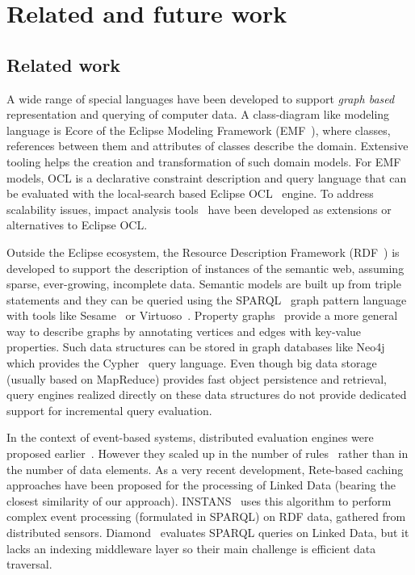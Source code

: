 \chapter{Related and future work}
\label{chap:related-work}

\section{Related work}
\label{sec:relwork}

A wide range of special languages have been developed to support \emph{graph based} representation and querying of computer data. A class-diagram like modeling language is Ecore of the Eclipse Modeling Framework (EMF~\cite{EMF}), where classes, references between them and attributes of classes describe the domain. Extensive tooling helps the creation and transformation of such domain models. For EMF models, OCL is a declarative constraint description and query language that can be evaluated with the local-search based Eclipse OCL~\cite{EclipseOCL} engine. To address scalability issues, impact analysis tools~\cite{OCLIA} have been developed as extensions or alternatives to Eclipse OCL.

Outside the Eclipse ecosystem, the Resource Description Framework (RDF~\cite{website:rdf_standard}) is developed to support the description of instances of the semantic web, assuming sparse, ever-growing, incomplete data. Semantic models are built up from triple statements and they can be queried using the SPARQL~\cite{SPARQL} graph pattern language with tools like Sesame~\cite{sesame} or Virtuoso~\cite{openvirtuoso}. Property graphs~\cite{DBLP:journals/corr/abs-1006-2361} provide a more general way to describe graphs by annotating vertices and edges with key-value properties. Such data structures can be stored in graph databases like Neo4j~\cite{neo4j} which provides the Cypher~\cite{cypher} query language. Even though big data storage (usually based on MapReduce) provides fast object persistence and retrieval, query engines realized directly on these data structures do not provide dedicated support for incremental query evaluation. 

In the context of event-based systems, distributed evaluation engines were proposed earlier~\cite{message-passing-rete}. However they scaled up in the number of rules~\cite{mapreduce-rete} rather than in the number of data elements. As a very recent development, Rete-based caching approaches have been proposed for the processing of Linked Data (bearing the closest similarity of our approach). INSTANS~\cite{INSTANS2012} uses this algorithm to perform complex event processing (formulated in SPARQL) on RDF data, gathered from distributed sensors. Diamond~\cite{miranker2012diamond} evaluates SPARQL queries on Linked Data, but it lacks an indexing middleware layer so their main challenge is efficient data traversal.

